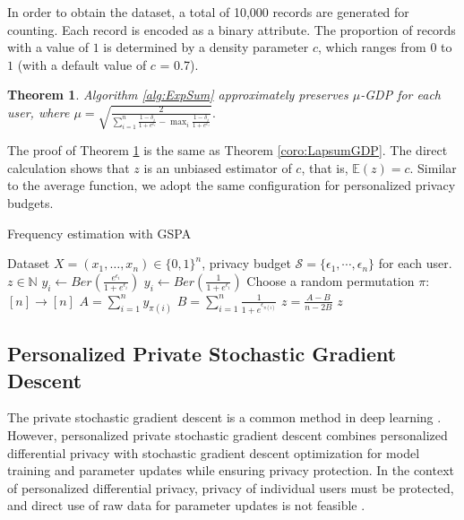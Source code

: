 \documentclass[letterpaper]{article} %
\newtheorem{theorem}{Theorem}
\begin{document}
In order to obtain the dataset, a total of 10,000 records are generated for counting. Each record is encoded as a binary attribute. The proportion of records with a value of $1$ is determined by a density parameter $c$, which ranges from $0$ to $1$ (with a default value of $c$ = 0.7).
\begin{theorem}\label{coro:ExpSumGDP}
Algorithm \ref{alg:ExpSum} approximately preserves $\mu$-GDP for each user, where $
\mu = \sqrt{\frac{2}{\sum_{i=1}^{n} \frac{1-\delta_i}{1+e^{\epsilon_i}}-\max_{i}{\frac{1-\delta_{i}}{1+e^{\epsilon_{i}}}}}}.
$
\end{theorem}
The proof of Theorem \ref{coro:ExpSumGDP} is the same as Theorem \ref{coro:LapsumGDP}. The direct calculation shows that $z$ is an unbiased estimator of $c$, that is, $\mathbb{E}(z)=c$. Similar to the average function, we adopt the same configuration for personalized privacy budgets.


\begin{algorithm}[htbp]
    \caption{Frequency estimation with GSPA}
    \label{alg:ExpSum}
    \renewcommand{\algorithmicrequire}{\textbf{Input:}}
    \renewcommand{\algorithmicensure}{\textbf{Output:}}
    \begin{algorithmic}[1]
        \REQUIRE Dataset $X = (x_1,\ldots,x_n)\in \{0,1\}^n$, privacy budget $\mathcal{S} = \{\epsilon_1, \cdots, \epsilon_n\}$ for each user.
        \ENSURE $z \in \mathbb{N}$   %
        \STATE $y_i \leftarrow Ber(\frac{e^{\epsilon_i}}{1+e^{\epsilon_i}})$
        \ELSE
        \STATE $y_i \leftarrow Ber(\frac{1}{1+e^{\epsilon_i}})$
        \ENDIF
        \ENDFOR
        \STATE Choose a random permutation $\pi$: $[n] \rightarrow [n]$
        \STATE $A =  \sum_{i=1}^n y_{\pi(i)}$
        \STATE $B = \sum_{i=1}^n \frac{1}{1+e^{\epsilon_{\pi(i)}}}$
        \STATE $z =\frac{A-B}{n-2B} $
        \RETURN $z$
    \end{algorithmic}
\end{algorithm}


\subsection{Personalized Private Stochastic Gradient Descent}
The private stochastic gradient descent is a common method in deep learning \cite{abadi2016deep}. 
However, personalized private stochastic gradient descent  combines personalized differential privacy  with stochastic gradient descent optimization for model training and parameter updates while ensuring privacy protection.
In the context of personalized differential privacy, privacy of individual users must be protected, and direct use of raw data for parameter updates is not feasible .
\end{document}
